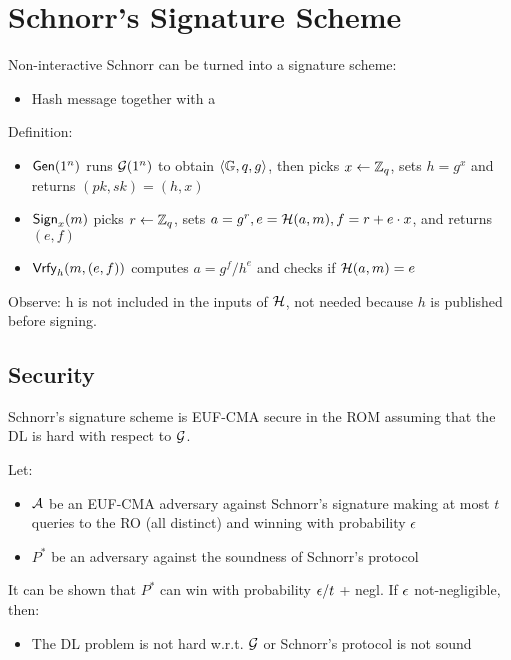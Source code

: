 \documentclass[12pt]{article}
\begin{document}
\section{Schnorr's Signature Scheme}
Non-interactive Schnorr can be turned into a signature scheme:
\begin{itemize}
	\item Hash message together with a
\end{itemize}

Definition:
\begin{itemize}
	\item $\operatorname{\mathsf{Gen}}(1^n)$ runs $\mathcal{G}(1^n)$ to obtain $\langle \mathbb{G}, q, g \rangle$, then picks $x \leftarrow \mathbb{Z}_q$, sets $h=g^x$ and returns $(pk,sk)=(h,x)$
	\item $\operatorname{\mathsf{Sign}}_x(m)$ picks $r \leftarrow \mathbb{Z}_q$, sets $a=g^r, e=\mathcal{H}(a,m), f=r+e\cdot x$, and returns $(e,f)$
	\item $\operatorname{\mathsf{Vrfy}}_h(m,(e,f))$ computes $a=g^f/h^e$ and checks if $\mathcal{H}(a,m)=e$ 
\end{itemize}
Observe: h is not included in the inputs of $\mathcal{H}$, not needed because $h$ is published before signing.

\subsection{Security}
Schnorr's signature scheme is EUF-CMA secure in the ROM assuming that the DL is hard with respect to $\mathcal{G}$.

Let:
\begin{itemize}
	\item $\mathcal{A}$ be an EUF-CMA adversary against Schnorr's signature making at most $t$ queries to the RO (all distinct) and winning with probability $\epsilon$
	\item $P^*$ be an adversary against the soundness of Schnorr's protocol
\end{itemize}
It can be shown that $P^*$ can win with probability $\epsilon/t$ + negl. If $\epsilon$ not-negligible, then:
\begin{itemize}
	\item The DL problem is not hard w.r.t. $\mathcal{G}$ or Schnorr's protocol is not sound
\end{itemize}
\end{document}
